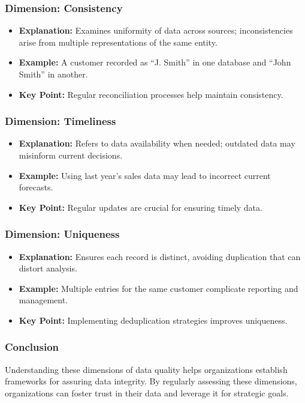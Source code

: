 \documentclass{beamer}
\begin{document}
\begin{frame}[fragile]
    \frametitle{Dimension: Consistency}
    \begin{itemize}
        \item \textbf{Explanation:} Examines uniformity of data across sources; inconsistencies arise from multiple representations of the same entity.
        \item \textbf{Example:} A customer recorded as ``J. Smith'' in one database and ``John Smith'' in another.
        \item \textbf{Key Point:} Regular reconciliation processes help maintain consistency.
    \end{itemize}
\end{frame}

\begin{frame}[fragile]
    \frametitle{Dimension: Timeliness}
    \begin{itemize}
        \item \textbf{Explanation:} Refers to data availability when needed; outdated data may misinform current decisions.
        \item \textbf{Example:} Using last year's sales data may lead to incorrect current forecasts.
        \item \textbf{Key Point:} Regular updates are crucial for ensuring timely data.
    \end{itemize}
\end{frame}

\begin{frame}[fragile]
    \frametitle{Dimension: Uniqueness}
    \begin{itemize}
        \item \textbf{Explanation:} Ensures each record is distinct, avoiding duplication that can distort analysis.
        \item \textbf{Example:} Multiple entries for the same customer complicate reporting and management.
        \item \textbf{Key Point:} Implementing deduplication strategies improves uniqueness.
    \end{itemize}
\end{frame}

\begin{frame}[fragile]
    \frametitle{Conclusion}
    Understanding these dimensions of data quality helps organizations establish frameworks for assuring data integrity. By regularly assessing these dimensions, organizations can foster trust in their data and leverage it for strategic goals.
\end{frame}
\end{document}

